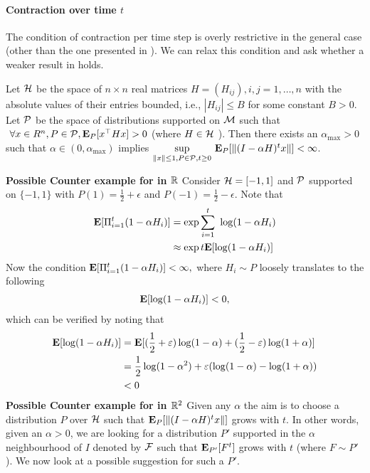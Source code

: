 \paragraph{Contraction over time $t$}
The condition of contraction per time step is overly restrictive in the general case (other than the one presented in ). We can relax this condition and ask whether a weaker result in  holds.
\begin{lemma}\label{multheorem}
Let $\H$ be the space of $n\times n$ real matrices $H=(H_{ij}),i,j=1,\ldots,n$ with the absolute values of their entries bounded, i.e., $|H_{ij}|\leq B$ for some constant $B>0$. Let $\P$ be the space of distributions supported on $\M$ such that $~\forall x\in R^n, P\in \P,\E_{P}[x^\top H x] >0$ (where $H\in\H$ ). Then there exists an $\alpha_{\max}>0$ such that $\alpha\in(0,\alpha_{\max})$ implies $\us{\sup}{\norm{x}\leq 1,P\in\P,t\geq 0}\E_{P}[\norm{(I-\alpha H)^tx}]< \infty$.
\end{lemma}
\textbf{Possible Counter example for  in $\R$}
Consider $\H=[-1,1]$ and $\P$ supported on $\{-1,1\}$ with $P(1)=\frac{1}{2}+\epsilon$ and $P(-1)=\frac{1}{2}-\epsilon$. Note that
\begin{align*}
\E[\Pi_{i=1}^t (1-\alpha H_i)]&=\exp{\ous{\sum}{i=1}{t}\log(1-\alpha H_i)}\\
&\approx \exp{t\E[\log(1-\alpha H_i)]}
\end{align*}
Now the condition $\E[\Pi_{i=1}^t (1-\alpha H_i)]<\infty,$ where $H_i\sim P$ loosely translates to the following
\begin{align*}
\E[\log(1-\alpha H_i)]<0,
\end{align*}
which can be verified by noting that
\begin{align*}
\E[\log(1-\alpha H_i)]&=\E[(\frac{1}{2}+\epsilon)\log (1-\alpha)+(\frac{1}{2}-\epsilon)\log (1+\alpha)]\\
&=\frac{1}{2}\log(1-\alpha^2)+\epsilon(\log(1-\alpha)-\log(1+\alpha))\\
&<0
\end{align*}
\textbf{Possible Counter example for  in $\R^2$}
Given any $\alpha$ the aim is to choose a distribution $P$ over $\H$ such that $\E_{P}[\norm{(I-\alpha H)^tx}]$ grows with $t$. In other words, given an $\alpha>0$, we are looking for a distribution $P'$ supported in the $\alpha$ neighbourhood of $I$ denoted by $\F$ such that $\E_{P'}[F^t]$ grows with $t$ (where $F\sim P'$). We now look at a possible suggestion for such a $P'$.\par

